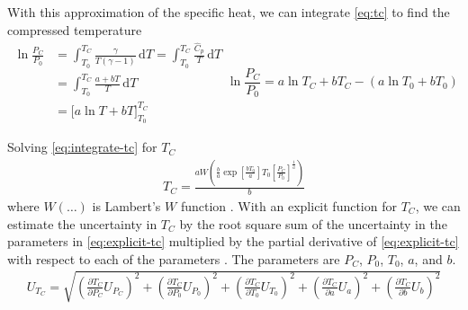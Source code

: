 \documentclass[12pt, letterpaper]{article}
\begin{document}
With this approximation of the specific heat, we can integrate \autoref{eq:tc}
to find the compressed temperature
%
\begin{subequations}
\begin{align}
\ln{\frac{P_C}{P_0}} &= \int_{T_0}^{T_{C}} \! \frac{\gamma}{T\left(\gamma-1\right)} \, \mathrm{d} T
                      = \int_{T_0}^{T_{C}} \! \frac{\hat{C}_p}{T} \, \mathrm{d} T \\
&= \int_{T_0}^{T_{C}} \! \frac{a + b T}{T} \, \mathrm{d} T\\
&= \Big[a \ln{T} + b T \Big]_{T_0}^{T_C}
\end{align}
\begin{equation}
\ln{\frac{P_C}{P_0}} = a \ln{T_C} + b T_C - \left(a \ln{T_0} + b T_0\right) \label{eq:integrate-tc}
\end{equation}
\end{subequations}

Solving \autoref{eq:integrate-tc} for $T_C$
%
\begin{align}
\label{eq:explicit-tc}
T_C = \frac{a W\!\left(\frac{b}{a} \exp\!{\left[\frac{b T_0}{a}\right]} T_0 \left[\frac{P_C}{P_0}\right]^{\frac{1}{a}}\right)}{b}
\end{align}
%
where $W(\ldots)$ is Lambert's $W$ function \cite{Corless1996}. With an explicit function for $T_C$, we can
estimate the uncertainty in $T_C$ by the root square sum of the uncertainty in the parameters in
\autoref{eq:explicit-tc} multiplied by the partial derivative of \autoref{eq:explicit-tc} with
respect to each of the parameters \cite{Taylor1982}. The parameters are $P_C$, $P_0$, $T_0$, $a$, and $b$.
%
\begin{align}
\label{eq:tc-unc}
U_{T_C} = \sqrt{\left(\frac{\partial T_C}{\partial P_C} U_{P_C}\right)^2 + \left(\frac{\partial T_C}{\partial P_0} U_{P_0}\right)^2 +
                \left(\frac{\partial T_C}{\partial T_0} U_{T_0}\right)^2 + \left(\frac{\partial T_C}{\partial a} U_{a}\right)^2 +
                \left(\frac{\partial T_C}{\partial b} U_{b}\right)^2}
\end{align}
\end{document}
